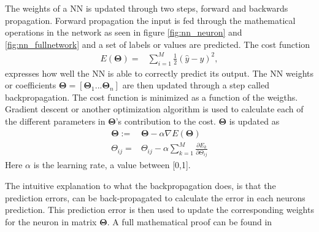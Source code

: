         The weights of a NN is updated through two steps, forward and backwards propagation. Forward propagation the input is fed through the mathematical operations in the network as seen in figure \ref{fig:nn_neuron} and \ref{fig:nn_fullnetwork} and a set of labels or values are predicted. The cost function 
        \begin{align}
            E(\bm\Theta) = &\sum_{i=1}^M\frac{1}{2}(\hat{y} - y)^2 \nonumber,
            \label{nn:cost}
        \end{align}
        expresses how well the NN is able to correctly predict its output. The NN weights or coefficients $\bm \Theta = [\bm \Theta_1 ... \bm \Theta_n]$ are then updated through a step called backpropagation. The cost function is minimized as a function of the weigths. Gradient descent or another optimization algorithm is used to calculate each of the different parameters in $\bm \Theta$'s contribution to the cost. $\bm \Theta$ is updated as 
        \begin{align}
            \bm \Theta := & \bm \Theta - \alpha \nabla E(\bm \Theta) \nonumber \\
            \Theta_{ij} = & \Theta_{ij} - \alpha \sum_{k=1}^M \frac{\partial E_k}{\partial \Theta_{ij}} 
            \label{bp:1}
        \end{align}
        Here $\alpha$ is the learning rate, a value between [0,1].
        
        The intuitive explanation to what the backpropagation does, is that the prediction errors, can be back-propagated to calculate the error in each neurons prediction. This prediction error is then used to update the corresponding weights for the neuron in matrix $\bm \Theta$. A full mathematical proof can be found in \cite{myself}
        
        
